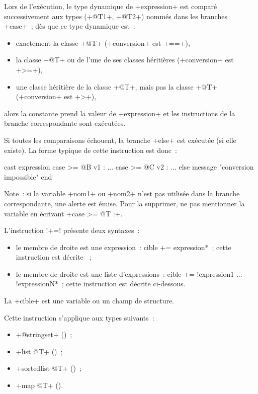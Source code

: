 Lors de l'exécution, le type dynamique de \ggst+expression+ est comparé successivement aux types (\ggst+@T1+, \ggst+@T2+) nommés dans les branches \ggst+case+~; dès que ce type dynamique est~:
\begin{itemize}
  \item exactement la classe \ggst+@T+ (\ggst+conversion+ est \ggst+==+),
  \item la classe \ggst+@T+ ou de l'une de ses classes héritières (\ggst+conversion+ est \ggst+>=+),
  \item une classe héritière de la classe \ggst+@T+, mais pas la classe \ggst+@T+ (\ggst+conversion+ est \ggst+>+),
\end{itemize}
alors la constante prend la valeur de \ggst+expression+ et les instructions de la branche correspondante sont exécutées.

Si toutes les comparaisons échouent, la branche \ggst+else+ est exécutée (si elle existe). La forme typique de cette instruction est donc~:


\begin{galgas3box}
cast expression
case >= @B v1 :
  ...
case >= @C v2 :
  ...
else
  message "conversion impossible"
end
\end{galgas3box}

Note~: si la variable \ggst+nom1+ ou  \ggst+nom2+ n'est pas utilisée dans la branche correspondante, une alerte est émise. Pour la supprimer, ne pas mentionner la variable en écrivant \ggst+case >= @T :+.










L'instruction \ggst!+=! présente deux syntaxes~:
\begin{itemize}
  \item le membre de droite est une expression~: \ggst*cible += expression*~; cette instruction est décrite ~;
  \item le membre de droite est une liste d'expressions~: \ggst*cible += !expression1 ... !expressionN*~; cette instruction est décrite ci-dessous.
\end{itemize}

La \ggst+cible+ est une variable ou un champ de structure.

Cette instruction s'applique aux types suivants~:
\begin{itemize}
  \item \ggst+@stringset+ ()~;
  \item \ggst+list @T+ ()~;
  \item \ggst+sortedlist @T+ ()~;
  \item \ggst+map @T+ ().
\end{itemize}


